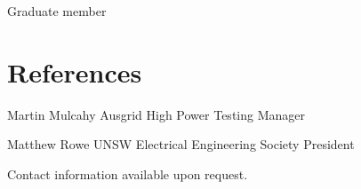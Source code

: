 \documentclass[a4paper]{friggeri-cv} %
\newcommand\shortdot[1]{
\vspace{-\parsep}
\vspace{-1em}
\begin{itemize*}
#1
\end{itemize*} 
}
\begin{document}
{\shortdot{\item Graduate member}}

\section{References}







\vspace{-\multicolsep}
\vspace{\parskip}
\begin{multicols}{2} %

\entry
{}
{Martin Mulcahy}
{Ausgrid}{
High Power Testing Manager
}


\begin{comment}
\entry
{}
{Eliathamby Ambikairajah}
{University of New South Wales - Head of Electrical Engineering}
{
\faPhone{} 02 9385 4009 \\
\href{ambi@ee.unsw.edu.au}{\faLaptop{} ambi@ee.unsw.edu.au}
}
\end{comment}




\entry
{}
{Matthew Rowe}
{UNSW Electrical Engineering Society}{
President
}


\end{multicols}

\vspace{-\multicolsep}
\vspace{0.1cm}
Contact information available upon request.




\end{document}
